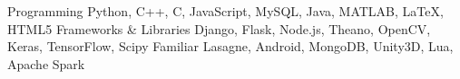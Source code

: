 \begin{cvskills}
  \cvskill
    {Programming}
    {Python, C++, C, JavaScript, MySQL, Java, MATLAB, \LaTeX, HTML5}
  \cvskill
    {Frameworks \& Libraries}
    {Django, Flask, Node.js, Theano, OpenCV, Keras, TensorFlow, Scipy}
  \cvskill
    {Familiar}
    {Lasagne, Android, MongoDB, Unity3D, Lua, Apache Spark}
\end{cvskills}